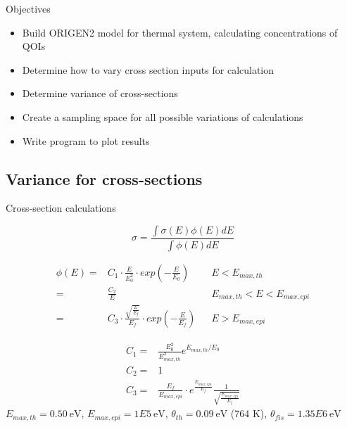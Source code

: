 \documentclass{beamer}
\newcommand{\cmark}{\ding{51}}%
\newcommand{\xmark}{\ding{55}}%
\newcommand{\done}{\rlap{$\square$}{\raisebox{2pt}{\large\hspace{1pt}\cmark}}%
  \hspace{-2.5pt}}
\newcommand{\wontfix}{\rlap{$\square$}{\large\hspace{1pt}\xmark}}
\newcommand{\ndone}{\rlap{$\square$}{\raisebox{2pt}{}}%
  \hspace{8pt}}
\begin{document}
\begin{frame}
  \begin{block}{Objectives}
    \vspace{0.3cm}
  \begin{itemize}
  \item[\done]{Build ORIGEN2 model for thermal system, calculating
  concentrations of QOIs}
  \item[\wontfix]{Determine how to vary cross section inputs for calculation}
  \item[\ndone]{Determine variance of cross-sections}
  \item[\ndone]{Create a sampling space for all possible variations of
    calculations}
  \item[\ndone]{Write program to plot results}
  \end{itemize}
  \vspace{0.3cm}
\end{block}
\end{frame}



\subsection{Variance for cross-sections}
\begin{frame}{Cross-section calculations}

  \begin{equation*}
    \sigma=\frac{\int\sigma(E)\phi(E)dE}{\int\phi(E)dE}
  \end{equation*}

  \begin{align*}
    \phi(E) =& C_1\cdot \frac{E}{E_0^2} \cdot
    exp\left(-\frac{E}{E_0}\right) &&E<E_{max,th}\\
    =& \frac{C_2}{E}  &&E_{max,th}<E<E_{max,epi}\\
    =& C_3 \cdot \frac{\sqrt{\frac{E}{E_f}}}{E_f}
    \cdot exp\left(-\frac{E}{E_{f}}
    \right) &&E>E_{max,epi}
  \end{align*}


  {\tiny
    \setlength{\abovedisplayskip}{6pt}
    \setlength{\belowdisplayskip}{\abovedisplayskip}
    \setlength{\abovedisplayshortskip}{0pt}
    \setlength{\belowdisplayshortskip}{3pt}
    \begin{align*}
      C_1=&\frac{E_0^2}{E^2_{max,th}}e^{E_{max,th}/E_0}
      \\
      C_2=&1\\
      C_3=&\frac{E_f}{E_{max,epi}}
      \cdot
      e^{\frac{E_{max,epi}}{E_f}}\frac{1}
      {\sqrt{\frac{E_{max,epi}}{E_f}}}
    \end{align*}
    }%
  {\tiny
  $E_{max,th}=0.50\ \text{eV}$,
  $E_{max,epi}=1E5\ \text{eV}$,
  $\theta_{th}=0.09\ \text{eV}$ (764 K),
  $\theta_{fis}=1.35E6\ \text{eV}$}%
\end{frame}
\end{document}
